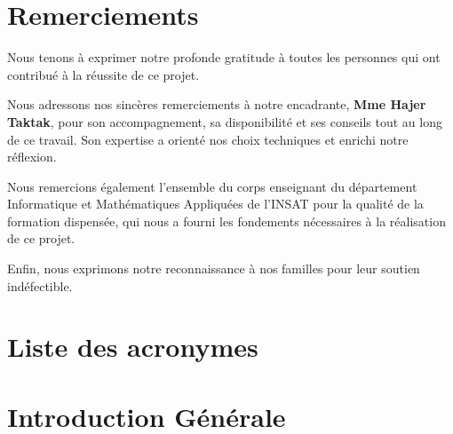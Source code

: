 ﻿\documentclass[12pt,a4paper]{report}
\begin{document}
\chapter*{Remerciements}
\pagestyle{plain}

Nous tenons à exprimer notre profonde gratitude à toutes les personnes qui ont contribué à la réussite de ce projet.

Nous adressons nos sincères remerciements à notre encadrante, \textbf{Mme Hajer Taktak}, pour son accompagnement, sa disponibilité et ses conseils tout au long de ce travail. Son expertise a orienté nos choix techniques et enrichi notre réflexion.

Nous remercions également l'ensemble du corps enseignant du département Informatique et Mathématiques Appliquées de l'INSAT pour la qualité de la formation dispensée, qui nous a fourni les fondements nécessaires à la réalisation de ce projet.

Enfin, nous exprimons notre reconnaissance à nos familles pour leur soutien indéfectible.

\newpage


\tableofcontents \newpage
\listoffigures   {}   \newpage
\listoftables    {}  \newpage

\chapter*{Liste des acronymes}
\begin{acronym}
\end{acronym}
\newpage
\pagestyle{fancy}

\chapter*{Introduction Générale}
\end{document}
